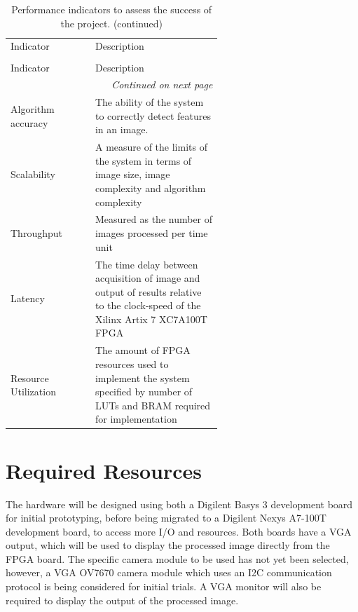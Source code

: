 \begin{center}
    \small
    \begin{longtable}{lp{0.6\linewidth}}
        \label{tab:performance}
        \caption{Table of performance indicators.} \\
        \toprule
        Indicator & Description \\
        \midrule
        \endfirsthead
        
        \caption{Performance indicators to assess the success of the project. (continued)} \\
        \toprule
        Indicator & Description \\
        \midrule
        \endhead
        
        \bottomrule
        \multicolumn{2}{r}{\textit{Continued on next page}} \\
        \endfoot
        
        \bottomrule
        \endlastfoot
        
        Algorithm accuracy      & The ability of the system to correctly detect features in an image. \\
        Scalability             & A measure of the limits of the system in terms of image size, image complexity and algorithm complexity \\
        Throughput              & Measured as the number of images processed per time unit \\
        Latency                 & The time delay between acquisition of image and output of results relative to the clock-speed of the Xilinx Artix 7 XC7A100T FPGA \\
        Resource Utilization    & The amount of FPGA resources used to implement the system specified by number of LUTs and BRAM required for implementation \\
    \end{longtable}
\end{center}

\section{Required Resources}
The hardware will be designed using both a Digilent Basys 3 development board for initial prototyping, before being migrated to a Digilent Nexys A7-100T development board, to access more I/O and resources. 
Both boards have a VGA output, which will be used to display the processed image directly from the FPGA board. 
The specific camera module to be used has not yet been selected, however, a VGA OV7670 camera module which uses an I2C communication protocol is being considered for initial trials.
A VGA monitor will also be required to display the output of the processed image.

